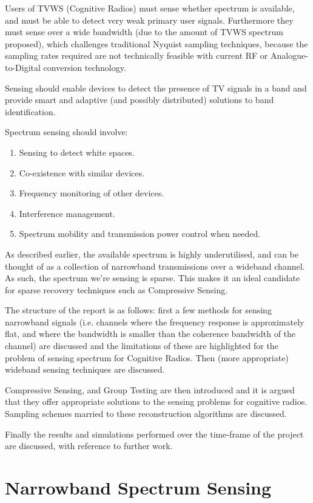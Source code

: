\documentclass[12pt, a4paper]{article}
\begin{document}
Users of TVWS (Cognitive Radios) must sense whether spectrum is available, and must be able to detect very weak primary user signals. Furthermore they must sense over a wide bandwidth (due to the amount of TVWS spectrum proposed), which challenges traditional Nyquist sampling techniques, because the sampling rates required are not technically feasible with current RF or Analogue-to-Digital conversion technology.

Sensing should enable devices to detect the presence of TV signals in a band and provide smart and adaptive (and possibly distributed) solutions to band identification.

Spectrum sensing should involve:

\begin{enumerate}
\item Sensing to detect white spaces.
\item Co-existence with similar devices.
\item Frequency monitoring of other devices.
\item Interference management. 
\item Spectrum mobility and transmission power control when needed.
\end{enumerate}

As described earlier, the available spectrum is highly underutilised, and can be thought of as a collection of narrowband transmissions over a wideband channel. As such, the spectrum we're sensing is sparse. This makes it an ideal candidate for sparse recovery techniques such as Compressive Sensing.  

The structure of the report is as follows: first a few methods for sensing narrowband signals (i.e. channels where the frequency response is approximately flat, and where the bandwidth is smaller than the coherence bandwidth of the channel) are discussed and the limitations of these are highlighted for the problem of sensing spectrum for Cognitive Radios. Then (more appropriate) wideband sensing techniques are discussed. 

Compressive Sensing, and Group Testing are then introduced and it is argued that they offer appropriate solutions to the sensing problems for cognitive radios. Sampling schemes married to these reconstruction algorithms are discussed. 

Finally the results and simulations performed over the time-frame of the project are discussed, with reference to further work. 

\section{Narrowband Spectrum Sensing}
\end{document}

